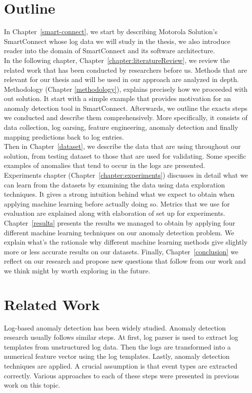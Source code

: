 \section{Outline}
In Chapter~\ref{smart-connect}, we start by describing Motorola Solution's SmartConnect whose log data we will study in the thesis, we also introduce reader into the domain of SmartConnect and its software architecture.\\
In the following chapter, Chapter~\ref{chapter:literatureReview}, we review the related work that has been conducted by researchers before us. Methods that are relevant for our thesis and will be used in our approach are analyzed in depth.\\
Methodology (Chapter \ref{methodology}), explains precisely how we proceeded with out solution. It start with a simple example that provides motivation for an anomaly detection tool in SmartConnect. Afterwards, we outline the exacts steps we conducted and describe them comprehensively. More specifically, it consists of data collection, log oarsing, feature engineering, anomaly detection and finally mapping predictions back to log entries.\\
Then in Chapter~\ref{dataset}, we describe the data that are using throughout our solution, from testing dataset to those that are used for validating. Some specific examples of anomalies that tend to occur in the logs are presented.\\
Experiments chapter (Chapter~\ref{chapter:experiments}) discusses in detail what we can learn from the datasets by examining the data using data exploration techniques.
It gives a strong intuition behind what we expect to obtain when applying machine learning before actually doing so. Metrics that we use for evaluation are explained along with elaboration of set up for experiments.\\
Chapter~\ref{results} presents the results we managed to obtain by applying four different machine learning techniques on our anomaly detection problem. We explain what's the rationale why different machine learning methods give slightly more or less accurate results on our datasets.
Finally, Chapter~\ref{conclusion} we reflect on our research and propose new questions that follow from our work and we think might by worth exploring in the future.


\section{Related Work}
Log-based anomaly detection has been widely studied. Anomaly detection research usually follows similar steps. At first, log parser is used to extract log templates from unstructured log data. Then the logs are transformed into a numerical feature vector using the log templates. Lastly, anomaly detection techniques are applied. A crucial assumption is that event types are extracted correctly. Various approaches to each of these steps were presented in previous work on this topic. 

